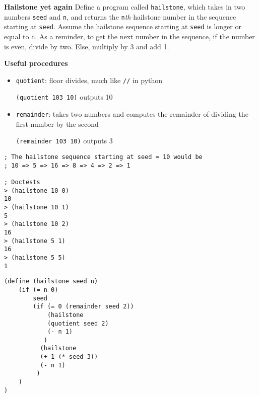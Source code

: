 \begin{blocksection}
\question \textbf{Hailstone yet again} Define a program called \lstinline$hailstone$,
which takes in two numbers \lstinline$seed$ and \lstinline$n$, and returns the
\lstinline$n$\emph{th} hailstone number in the sequence starting at \lstinline$seed$.
Assume the hailstone sequence starting at \lstinline$seed$ is longer or equal to
\lstinline$n$. As a reminder, to get the next number in the sequence, if the number
is even, divide by two. Else, multiply by 3 and add 1.

\textbf{Useful procedures}

\begin{itemize}
\item \lstinline$quotient$: floor divides, much like \lstinline$//$ in python

\lstinline$(quotient 103 10)$ outputs 10

\item \lstinline$remainder$: takes two numbers and computes the remainder of dividing the first number by the second

\lstinline$(remainder 103 10)$ outputs 3
\end{itemize}

\ifprintanswers\else
\begin{lstlisting}
; The hailstone sequence starting at seed = 10 would be
; 10 => 5 => 16 => 8 => 4 => 2 => 1

; Doctests
> (hailstone 10 0)
10
> (hailstone 10 1)
5
> (hailstone 10 2)
16
> (hailstone 5 1)
16
> (hailstone 5 5)
1
\end{lstlisting}
\fi

\begin{solution}[1in]
\begin{lstlisting}
(define (hailstone seed n)
    (if (= n 0)
        seed
        (if (= 0 (remainder seed 2))
            (hailstone
            (quotient seed 2)
            (- n 1)
           )
          (hailstone
          (+ 1 (* seed 3))
          (- n 1)
         )
    )
)
\end{lstlisting}
\end{solution}
\end{blocksection}
